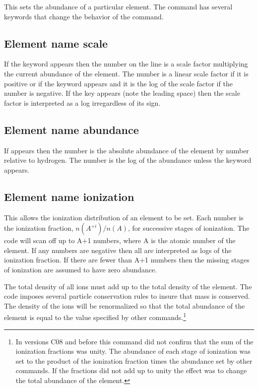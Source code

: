 This sets the abundance of a particular element.
The command has several
keywords that change the behavior of the command.

\subsection{Element name scale}

If the keyword  appears
then the number on the line is a scale factor
multiplying the current abundance of the element.
The number is a linear
scale factor if it is positive or if the 
keyword appears and it is
the log of the scale factor if the number is negative.
If the key 
appears (note the leading space) then the scale factor
is interpreted as
a log irregardless of its sign.

\subsection{Element name abundance}

If  appears then the number is
the absolute abundance of the
element by number relative to hydrogen.
The number is the log of the
abundance unless the  keyword appears.

\subsection{Element name ionization }

This allows the ionization distribution of an element to be set.
Each
number is the ionization fraction, $n(A^{+i})/n(A)$,
for successive stages of
ionization.
The code will scan off up to A+1 numbers, where A is the atomic
number of the element.
If any numbers are negative then all are interpreted
as logs of the ionization fraction.
If there are fewer than A+1 numbers
then the missing stages of ionization are assumed to have zero abundance.

The total density of all ions must add up to the total density of the element.
The code imposes several particle conservation rules to insure that
mass is conserved.
The density of the ions will be renormalized so that the
total abundance of the element is equal to the value
specified by other commands.\footnote{In versions C08 and before this
command did not confirm that the sum of the ionization fractions
was unity.  The abundance of each stage of ionization was set to the product
of the ionization fraction times the abundance set by other commands.  If the
fractions did not add up to unity the effect was to change the total
abundance of the element.}

